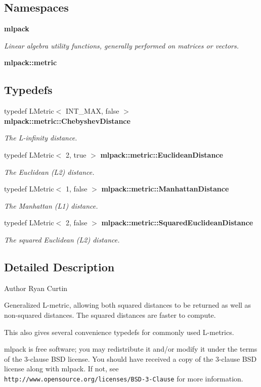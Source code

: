 \subsection*{Namespaces}
\begin{DoxyCompactItemize}
\item 
 {\bf mlpack}
\begin{DoxyCompactList}\small\item\em Linear algebra utility functions, generally performed on matrices or vectors. \end{DoxyCompactList}\item 
 {\bf mlpack\+::metric}
\end{DoxyCompactItemize}
\subsection*{Typedefs}
\begin{DoxyCompactItemize}
\item 
typedef L\+Metric$<$ I\+N\+T\+\_\+\+M\+AX, false $>$ {\bf mlpack\+::metric\+::\+Chebyshev\+Distance}
\begin{DoxyCompactList}\small\item\em The L-\/infinity distance. \end{DoxyCompactList}\item 
typedef L\+Metric$<$ 2, true $>$ {\bf mlpack\+::metric\+::\+Euclidean\+Distance}
\begin{DoxyCompactList}\small\item\em The Euclidean (L2) distance. \end{DoxyCompactList}\item 
typedef L\+Metric$<$ 1, false $>$ {\bf mlpack\+::metric\+::\+Manhattan\+Distance}
\begin{DoxyCompactList}\small\item\em The Manhattan (L1) distance. \end{DoxyCompactList}\item 
typedef L\+Metric$<$ 2, false $>$ {\bf mlpack\+::metric\+::\+Squared\+Euclidean\+Distance}
\begin{DoxyCompactList}\small\item\em The squared Euclidean (L2) distance. \end{DoxyCompactList}\end{DoxyCompactItemize}


\subsection{Detailed Description}
\begin{DoxyAuthor}{Author}
Ryan Curtin
\end{DoxyAuthor}
Generalized L-\/metric, allowing both squared distances to be returned as well as non-\/squared distances. The squared distances are faster to compute.

This also gives several convenience typedefs for commonly used L-\/metrics.

mlpack is free software; you may redistribute it and/or modify it under the terms of the 3-\/clause B\+SD license. You should have received a copy of the 3-\/clause B\+SD license along with mlpack. If not, see {\tt http\+://www.\+opensource.\+org/licenses/\+B\+S\+D-\/3-\/\+Clause} for more information. 